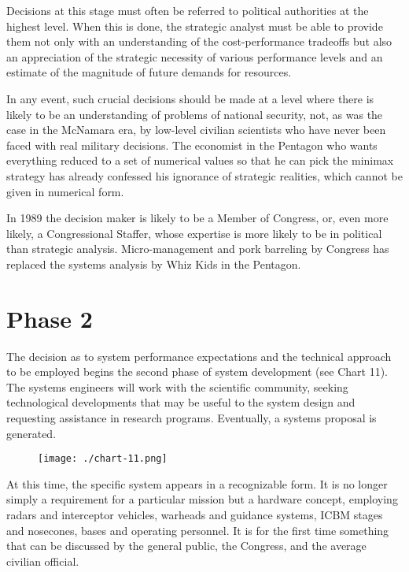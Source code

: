 Decisions at this stage must often be referred to political authorities at the highest level. When this is done, the strategic analyst must be able to provide them not only with an understanding of the cost-performance tradeoffs but also an appreciation of the strategic necessity of various performance levels and an estimate of the magnitude of future demands for resources.

In any event, such crucial decisions should be made at a level where there is likely to be an understanding of problems of national security, not, as was the case in the McNamara era, by low-level civilian scientists who have never been faced with real military decisions. The economist in the Pentagon who wants everything reduced to a set of numerical values so that he can pick the minimax strategy has already confessed his ignorance of strategic realities, which cannot be given in numerical form.

In 1989 the decision maker is likely to be a Member of Congress, or, even more likely, a Congressional Staffer, whose expertise is more likely to be in political than strategic analysis. Micro-management and pork barreling by Congress has replaced the systems analysis by Whiz Kids in the Pentagon.

\section{Phase 2}
The decision as to system performance expectations and the technical approach to be employed begins the second phase of system development (see Chart 11). The systems engineers will work with the scientific community, seeking technological developments that may be useful to the system design and requesting assistance in research programs. Eventually, a systems proposal is generated.

\begin{figure}
    \texttt{[image: ./chart-11.png]}
    \label{fig:chart-11}
\end{figure}

At this time, the specific system appears in a recognizable form. It is no longer simply a requirement for a particular mission but a hardware concept, employing radars and interceptor vehicles, warheads and guidance systems, ICBM stages and nosecones, bases and operating personnel. It is for the first time something that can be discussed by the general public, the Congress, and the average civilian official.

